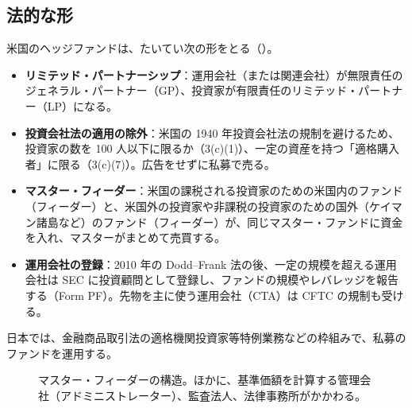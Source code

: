 \subsection{法的な形}

米国のヘッジファンドは、たいてい次の形をとる（）。

\begin{itemize}
\item \textbf{リミテッド・パートナーシップ}：運用会社（または関連会社）が無限責任のジェネラル・パートナー（GP）、投資家が有限責任のリミテッド・パートナー（LP）になる。
\item \textbf{投資会社法の適用の除外}：米国の 1940 年投資会社法の規制を避けるため、投資家の数を 100 人以下に限るか（3(c)(1)）、一定の資産を持つ「適格購入者」に限る（3(c)(7)）。広告をせずに私募で売る。
\item \textbf{マスター・フィーダー}：米国の課税される投資家のための米国内のファンド（フィーダー）と、米国外の投資家や非課税の投資家のための国外（ケイマン諸島など）のファンド（フィーダー）が、同じマスター・ファンドに資金を入れ、マスターがまとめて売買する。
\item \textbf{運用会社の登録}：2010 年の Dodd--Frank 法の後、一定の規模を超える運用会社は SEC に投資顧問として登録し、ファンドの規模やレバレッジを報告する（Form PF）。先物を主に使う運用会社（CTA）は CFTC の規制も受ける。
\end{itemize}

日本では、金融商品取引法の適格機関投資家等特例業務などの枠組みで、私募のファンドを運用する。

\begin{figure}[H]
\centering
{}
\caption{マスター・フィーダーの構造。ほかに、基準価額を計算する管理会社（アドミニストレーター）、監査法人、法律事務所がかかわる。}
\label{fig:structure}
\end{figure}

